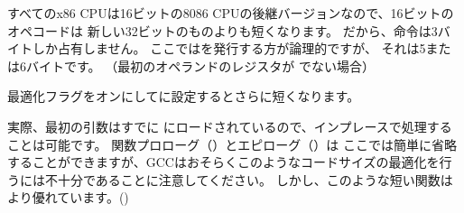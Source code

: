 すべてのx86 CPUは16ビットの8086 CPUの後継バージョンなので、16ビットのオペコードは
新しい32ビットのものよりも短くなります。 
だから、命令は3バイトしか占有しません。
ここではを発行する方が論理的ですが、
それは5または6バイトです。
（最初のオペランドのレジスタが \EAX でない場合）


\Othree 最適化フラグをオンにしてに設定するとさらに短くなります。




実際、最初の引数はすでに \EAX にロードされているので、インプレースで処理することは可能です。 
関数プロローグ（）とエピローグ（）は
ここでは簡単に省略することができますが、GCCはおそらくこのようなコードサイズの最適化を行うには不十分であることに注意してください。 
しかし、このような短い関数はより優れています。()
